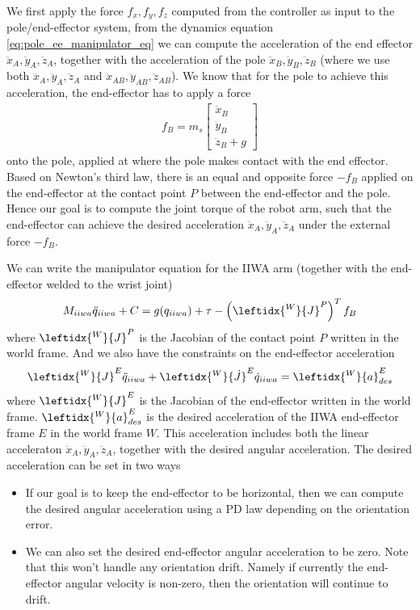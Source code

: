 \documentclass{article}
\begin{document}
We first apply the force $f_x, f_y, f_z$ computed from the controller as input to the pole/end-effector system, from the dynamics equation \eqref{eq:pole_ee_manipulator_eq} we can compute the acceleration of the end effector $\ddot{x}_A, \ddot{y}_A, \ddot{z}_A$, together with the acceleration of the pole $\ddot{x}_B, \ddot{y}_B, \ddot{z}_B$ (where we use both $\ddot{x}_A, \ddot{y}_A, \ddot{z}_A$ and $\ddot{x}_{AB}, \ddot{y}_{AB}, \ddot{z}_{AB}$). We know that for the pole to achieve this acceleration, the end-effector has to apply a force
\begin{align}
	f_B = m_s\begin{bmatrix}\ddot{x}_B \\ \ddot{y}_B \\ \ddot{z}_B + g\end{bmatrix}
\end{align}
onto the pole, applied at where the pole makes contact with the end effector. Based on Newton's third law, there is an equal and opposite force $-f_B$ applied on the end-effector at the contact point $P$ between the end-effector and the pole. Hence our goal is to compute the joint torque of the robot arm, such that the end-effector can achieve the desired acceleration $\ddot{x}_A, \ddot{y}_A, \ddot{z}_A$ under the external force $-f_B$.

We can write the manipulator equation for the IIWA arm (together with the end-effector welded to the wrist joint)
\begin{align}
	M_{iiwa}\ddot{q}_{iiwa} + C = g(q_{iiwa}) + \tau - \left(\leftidx{^W}{J}^P\right)^Tf_B\label{eq:iiwa_eom}
\end{align}
where $\leftidx{^W}{J}^P$ is the Jacobian of the contact point $P$ written in the world frame.
And we also have the constraints on the end-effector acceleration
\begin{align}
	\leftidx{^W}{J}^E\ddot{q}_{iiwa} + \leftidx{^W}{\dot{J}}^E\dot{q}_{iiwa} = \leftidx{^W}{a}^E_{des}\label{eq:iiwa_ee_acceleration}
\end{align}
where $\leftidx{^W}{J}^E$ is the Jacobian of the end-effector written in the world frame. $\leftidx{^W}{a}^E_{des}$ is the desired acceleration of the IIWA end-effector frame $E$ in the world frame $W$. This acceleration includes both the linear acceleraton $\ddot{x}_A, \ddot{y}_A, \ddot{z}_A$, together with the desired angular acceleration. The desired acceleration can be set in two ways
\begin{itemize}
	\item If our goal is to keep the end-effector to be horizontal, then we can compute the desired angular acceleration using a PD law depending on the orientation error.
	\item We can also set the desired end-effector angular acceleration to be zero. Note that this won't handle any orientation drift. Namely if currently the end-effector angular velocity is non-zero, then the orientation will continue to drift.
\end{itemize}
\end{document}
